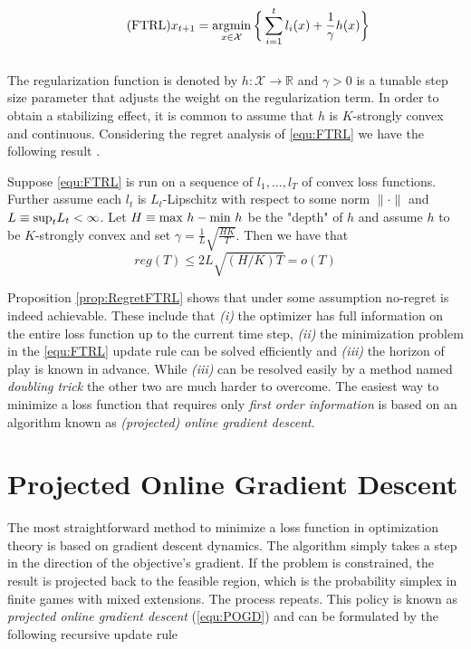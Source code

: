\begin{equation}
    \tag{FTRL}
    x_{t+1} = \operatorname*{\arg\!\min}_{x \in \mathcal{X}} \bigg\{\sum_{i=1}^t l_i(x) + \frac{1}{\gamma}h(x)\bigg\}
    \label{equ:FTRL}
\end{equation} \\

The regularization function is denoted by $h: \mathcal{X} \to \mathbb{R}$ and $\gamma > 0$ is a tunable step size parameter that adjusts the weight on the regularization term. In order to obtain a stabilizing effect, it is common to assume that $h$ is $K$-strongly convex and continuous. Considering the regret analysis of \ref{equ:FTRL} we have the following result \cite[Theorem 2.1]{HDRmertikopoulos}.

\begin{proposition}\label{prop:RegretFTRL}
    Suppose \ref{equ:FTRL} is run on a sequence of $l_1,\dots,l_T$ of convex loss functions. Further assume each $l_t$ is $L_t$-Lipschitz with respect to some norm $\|\cdot\|$ and $L \equiv \textnormal{sup}_t L_t < \infty$. Let $H \equiv \textnormal{max } h-\textnormal{min } h$ be the "depth" of $h$ and assume $h$ to be $K$-strongly convex and set $\gamma = \frac{1}{L}\sqrt{\frac{HK}{T}}$. Then we have that
    \[reg(T) \le 2L\sqrt{(H/K)T} = o(T)\]
\end{proposition} 

Proposition \ref{prop:RegretFTRL} shows that under some assumption no-regret is indeed achievable. These include that \textit{(i)} the optimizer has full information on the entire loss function up to the current time step, \textit{(ii)} the minimization problem in the \ref{equ:FTRL} update rule can be solved efficiently and \textit{(iii)} the horizon of play is known in advance. While \textit{(iii)} can be resolved easily by a method named \textit{doubling trick} \cite{shalev} the other two are much harder to overcome. The easiest way to minimize a loss function that requires only \textit{first order information} is based on an algorithm known as \textit{(projected) online gradient descent}.


\section{Projected Online Gradient Descent}\label{section:ProjectedOnlineGradienDescent}

The most straightforward method to minimize a loss function in optimization theory is based on gradient descent dynamics. The algorithm simply takes a step in the direction of the objective's gradient. If the problem is constrained, the result is projected back to the feasible region, which is the probability simplex in finite games with mixed extensions. The process repeats. This policy is known as \textit{projected online gradient descent} (\ref{equ:POGD}) and can be formulated by the following recursive update rule

